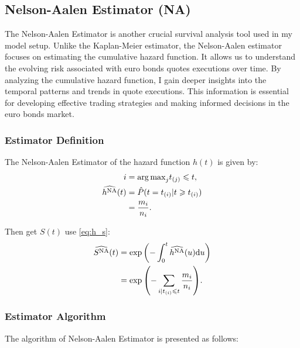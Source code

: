 \subsection{Nelson-Aalen Estimator (NA)}
The Nelson-Aalen Estimator is another crucial survival analysis tool used in my model setup. Unlike the Kaplan-Meier estimator, the Nelson-Aalen estimator focuses on estimating the cumulative hazard function. It allows us to understand the evolving risk associated with euro bonds quotes executions over time. By analyzing the cumulative hazard function, I gain deeper insights into the temporal patterns and trends in quote executions. This information is essential for developing effective trading strategies and making informed decisions in the euro bonds market.

\subsubsection{Estimator Definition}
The Nelson-Aalen Estimator of the hazard function $h(t)$ is given by:
\begin{align}
    i &= \mathrm{arg\,max}_j t_{(j)}\leqslant t, \notag\\
    \widehat {h^{\text{NA}}}(t) &= \hat P(t = t_{(i)} | t \geqslant t_{(i)})\notag\\
    &= \frac{m_i}{n_i}.\label{eq:na_hf}
\end{align}

Then get $S(t)$ use \eqref{eq:h_s}:
\begin{align}
    \widehat {S^{\text{NA}}}(t) &= \exp{\left(-\int_{0}^{t}\widehat {h^{\text{NA}}}(u)\text{d}u\right)}\notag\\
    &= \exp{\left(-\sum_{i|t_{(i)} \leqslant t} \frac{m_i}{n_i}\right)}.\label{eq:na_sf}
\end{align}

\subsubsection{Estimator Algorithm}
The algorithm of Nelson-Aalen Estimator is presented as follows:

